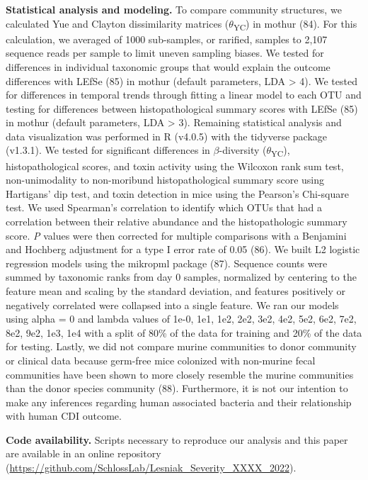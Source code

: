 \documentclass[
  12pt,
]{article}
\begin{document}
\textbf{Statistical analysis and modeling.} To compare community
structures, we calculated Yue and Clayton dissimilarity matrices
(\(\theta\)\textsubscript{YC}) in mothur (84). For this calculation, we
averaged of 1000 sub-samples, or rarified, samples to 2,107 sequence
reads per sample to limit uneven sampling biases. We tested for
differences in individual taxonomic groups that would explain the
outcome differences with LEfSe (85) in mothur (default parameters, LDA
\textgreater{} 4). We tested for differences in temporal trends through
fitting a linear model to each OTU and testing for differences between
histopathological summary scores with LEfSe (85) in mothur (default
parameters, LDA \textgreater{} 3). Remaining statistical analysis and
data visualization was performed in R (v4.0.5) with the tidyverse
package (v1.3.1). We tested for significant differences in
\(\beta\)-diversity (\(\theta\)\textsubscript{YC}), histopathological
scores, and toxin activity using the Wilcoxon rank sum test,
non-unimodality to non-moribund histopathological summary score using
Hartigans' dip test, and toxin detection in mice using the Pearson's
Chi-square test. We used Spearman's correlation to identify which OTUs
that had a correlation between their relative abundance and the
histopathologic summary score. \emph{P} values were then corrected for
multiple comparisons with a Benjamini and Hochberg adjustment for a type
I error rate of 0.05 (86). We built L2 logistic regression models using
the mikropml package (87). Sequence counts were summed by taxonomic
ranks from day 0 samples, normalized by centering to the feature mean
and scaling by the standard deviation, and features positively or
negatively correlated were collapsed into a single feature. We ran our
models using alpha = 0 and lambda values of 1e-0, 1e1, 1e2, 2e2, 3e2,
4e2, 5e2, 6e2, 7e2, 8e2, 9e2, 1e3, 1e4 with a split of 80\% of the data
for training and 20\% of the data for testing. Lastly, we did not
compare murine communities to donor community or clinical data because
germ-free mice colonized with non-murine fecal communities have been
shown to more closely resemble the murine communities than the donor
species community (88). Furthermore, it is not our intention to make any
inferences regarding human associated bacteria and their relationship
with human CDI outcome.

\textbf{Code availability.} Scripts necessary to reproduce our analysis
and this paper are available in an online repository
(\url{https://github.com/SchlossLab/Lesniak_Severity_XXXX_2022}).
\end{document}
